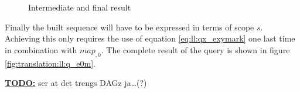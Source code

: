 \begin{figure}[!h]
\centering
{}
\qquad
{}
\qquad
{}
\label{fig:translation:ll:endExample}
\caption{Intermediate and final result}
\end{figure}

Finally the built sequence will have to be expressed in terms of scope $s$. Achieving this only requires the use
of equation \ref{eq:ll:qx_exymark} one last time in combination with $map_{ ,0}$. The complete result of the query
is shown in figure \ref{fig:translation:ll:q_e0m}.

\underline{\textbf{\LARGE TODO:}} ser at det trengs DAGz ja\ldots (?)